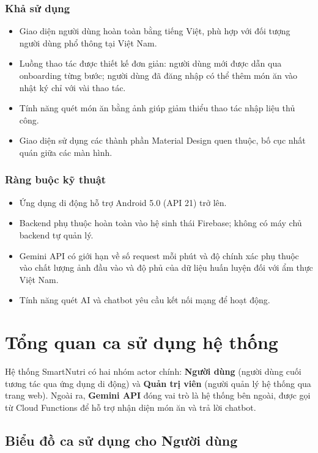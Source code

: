 \subsubsection{Khả sử dụng}
\begin{itemize}
    \item Giao diện người dùng hoàn toàn bằng tiếng Việt, phù hợp với đối tượng người dùng phổ thông tại Việt Nam.
    \item Luồng thao tác được thiết kế đơn giản: người dùng mới được dẫn qua onboarding từng bước; người dùng đã đăng nhập có thể thêm món ăn vào nhật ký chỉ với vài thao tác.
    \item Tính năng quét món ăn bằng ảnh giúp giảm thiểu thao tác nhập liệu thủ công.
    \item Giao diện sử dụng các thành phần Material Design quen thuộc, bố cục nhất quán giữa các màn hình.
\end{itemize}

\subsubsection{Ràng buộc kỹ thuật}
\begin{itemize}
    \item Ứng dụng di động hỗ trợ Android 5.0 (API 21) trở lên.
    \item Backend phụ thuộc hoàn toàn vào hệ sinh thái Firebase; không có máy chủ backend tự quản lý.
    \item Gemini API có giới hạn về số request mỗi phút và độ chính xác phụ thuộc vào chất lượng ảnh đầu vào và độ phủ của dữ liệu huấn luyện đối với ẩm thực Việt Nam.
    \item Tính năng quét AI và chatbot yêu cầu kết nối mạng để hoạt động.
\end{itemize}

\section{Tổng quan ca sử dụng hệ thống}

Hệ thống SmartNutri có hai nhóm actor chính: \textbf{Người dùng} (người dùng cuối tương tác qua ứng dụng di động) và \textbf{Quản trị viên} (người quản lý hệ thống qua trang web). Ngoài ra, \textbf{Gemini API} đóng vai trò là hệ thống bên ngoài, được gọi từ Cloud Functions để hỗ trợ nhận diện món ăn và trả lời chatbot.

\subsection{Biểu đồ ca sử dụng cho Người dùng}

